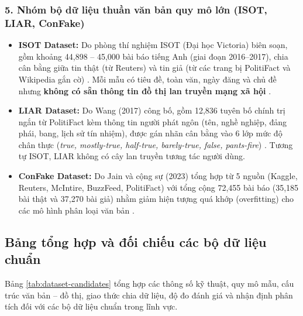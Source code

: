 \documentclass[11pt,a4paper]{extreport}
\begin{document}
\subsubsection{5. Nhóm bộ dữ liệu thuần văn bản quy mô lớn (ISOT, LIAR, ConFake)}
\begin{itemize}
    \item \textbf{ISOT Dataset:} Do phòng thí nghiệm ISOT (Đại học Victoria) biên soạn, gồm khoảng 44,898 -- 45,000 bài báo tiếng Anh (giai đoạn 2016--2017), chia cân bằng giữa tin thật (từ Reuters) và tin giả (từ các trang bị PolitiFact và Wikipedia gắn cờ) \cite{noauthor_comparative_2024, noauthor_hybrid_2025}. Mỗi mẫu có tiêu đề, toàn văn, ngày đăng và chủ đề nhưng \textbf{không có sẵn thông tin đồ thị lan truyền mạng xã hội} \cite{noauthor_comparative_2024}.
    \item \textbf{LIAR Dataset:} Do Wang (2017) công bố, gồm 12,836 tuyên bố chính trị ngắn từ PolitiFact kèm thông tin người phát ngôn (tên, nghề nghiệp, đảng phái, bang, lịch sử tín nhiệm), được gán nhãn cân bằng vào 6 lớp mức độ chân thực (\textit{true, mostly-true, half-true, barely-true, false, pants-fire}) \cite{noauthor_fake_2023, noauthor_comprehensive_2024}. Tương tự ISOT, LIAR không có cây lan truyền tương tác người dùng.
    \item \textbf{ConFake Dataset:} Do Jain và cộng sự (2023) tổng hợp từ 5 nguồn (Kaggle, Reuters, McIntire, BuzzFeed, PolitiFact) với tổng cộng 72,455 bài báo (35,185 bài thật và 37,270 bài giả) nhằm giảm hiện tượng quá khớp (overfitting) cho các mô hình phân loại văn bản \cite{noauthor_hybrid_2025}.
\end{itemize}

\subsection{Bảng tổng hợp và đối chiếu các bộ dữ liệu chuẩn}
Bảng \ref{tab:dataset-candidates} tổng hợp các thông số kỹ thuật, quy mô mẫu, cấu trúc văn bản -- đồ thị, giao thức chia dữ liệu, độ đo đánh giá và nhận định phân tích đối với các bộ dữ liệu chuẩn trong lĩnh vực.
\end{document}
